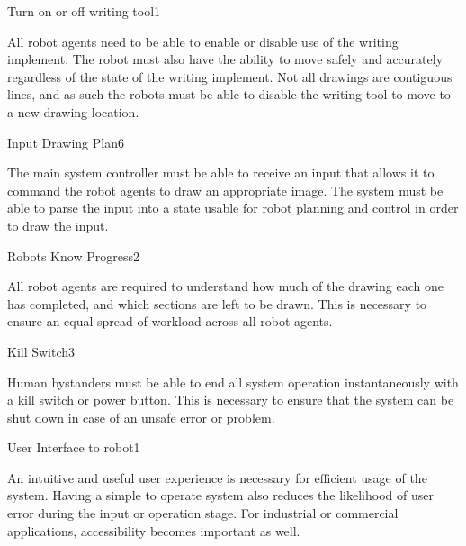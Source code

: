 \begin{functional_requirement}{Turn on or off writing tool}{1}
\item All robot agents need to be able to enable or disable use of the writing implement. The robot must also have the ability to move safely and accurately regardless of the state of the writing implement. Not all drawings are contiguous lines, and as such the robots must be able to disable the writing tool to move to a new drawing location. 
\end{functional_requirement}

\begin{functional_requirement}{Input Drawing Plan}{6}
\item The main system controller must be able to receive an input that allows it to command the robot agents to draw an appropriate image. The system must be able to parse the input into a state usable for robot planning and control in order to draw the input. 
\end{functional_requirement}

\begin{functional_requirement}{Robots Know Progress}{2}
\item All robot agents are required to understand how much of the drawing each one has completed, and which sections are left to be drawn. This is necessary to ensure an equal spread of workload across all robot agents. 
\end{functional_requirement}

\begin{functional_requirement}{Kill Switch}{3}
\item Human bystanders must be able to end all system operation instantaneously with a kill switch or power button. This is necessary to ensure that the system can be shut down in case of an unsafe error or problem. 
\end{functional_requirement}

\begin{functional_requirement}{User Interface to robot}{1}
\item An intuitive and useful user experience is necessary for efficient usage of the system. Having a simple to operate system also reduces the likelihood of user error during the input or operation stage. For industrial or commercial applications, accessibility becomes important as well. 
\end{functional_requirement}

